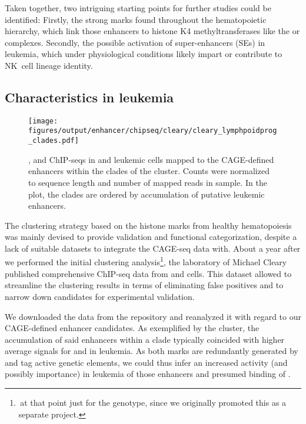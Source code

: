 Taken together, two intriguing starting points for further studies could be identified: Firstly, the strong \hisfourthree marks found throughout the hematopoietic hierarchy, which link those enhancers to histone K4 methyltransferases like the  or  complexes. Secondly, the possible activation of super-enhancers (SEs) in \mllafnine leukemia, which under physiological conditions likely impart or contribute to NK~cell lineage identity.

\label{chap:r:enhancers:amitend}
\subsection{Characteristics in \mllafnine leukemia}
\label{chap:r:enhancers:cluster:clades:clearydata}

\begin{figure}[!htb]
	\texttt{[image: figures/output/enhancer/chipseq/cleary/cleary\_lymphpoidprog\_clades.pdf]}
	\caption{\hisfourthree, \hiseighteenac and \histwentysevenac ChIP-seqs in \mllafnine \kitlow and \kithi leukemic cells mapped to the CAGE-defined enhancers within the clades of the \amitthree cluster. Counts were normalized to sequence length and number of mapped reads in sample. In the plot, the clades are ordered by accumulation of putative leukemic enhancers.}
	\label{fig:enhancers:cleary_lymphpoidprog_clades}
\end{figure}

The clustering strategy based on the histone marks from healthy hematopoiesis  was mainly devised to provide validation and functional categorization, despite a lack of suitable datasets to integrate the CAGE-seq data with. About a year after we performed the initial clustering analysis\footnote{\,at that point just for the \dnmtwt genotype, since we originally promoted this as a separate project.}, the laboratory of Michael Cleary published comprehensive ChIP-seq data from \mllafnine \kithi and \kitlow cells\cite{Wong2015}. This dataset allowed to streamline the clustering results in terms of eliminating false positives and to narrow down candidates for experimental validation.

We downloaded the data from the repository and reanalyzed it with regard to our CAGE-defined enhancer candidates. As exemplified by the \amitthree cluster, the accumulation of said enhancers within a clade typically coincided with higher average signals for \hiseighteenac and \histwentysevenac in leukemia. As both marks are redundantly generated by \cite{Jin2011} and tag active genetic elements, we could thus infer an increased activity (and possibly importance) in leukemia of those enhancers and presumed binding of \mllafnine \cite{Li2014}. 

